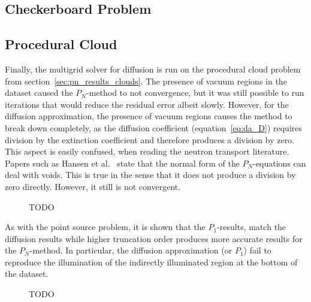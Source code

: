 \subsection{Checkerboard Problem}
\label{sec:da_results_checkerboard}

\subsection{Procedural Cloud}
\label{sec:da_results_clouds}

Finally, the multigrid solver for diffusion is run on the procedural cloud problem from section~\ref{sec:pn_results_clouds}. The presence of vacuum regions in the dataset caused the $P_N$-method to not convergence, but it was still possible to run iterations that would reduce the residual error albeit slowly. However, for the diffusion approximation, the presence of vacuum regions causes the method to break down completely, as the diffusion coefficient (equation~\ref{eq:da_D}) requires division by the extinction coefficient and therefore produces a division by zero. This aspect is easily confused, when reading the neutron transport literature. Papers such as Hansen et al.~\cite{Hansen14} state that the normal form of the $P_N$-equations can deal with voids. This is true in the sense that it does not produce a division by zero directly. However, it still is not convergent.

\begin{figure}[h]
\centering
{}
\caption{TODO}
\label{fig:da_results_nebulae_1}
\end{figure}

As with the point source problem, it is shown that the $P_1$-results, match the diffusion results while higher truncation order produces more accurate results for the $P_N$-method. In particular, the diffusion approximation (or $P_1$) fail to reproduce the illumination of the indirectly illuminated region at the bottom of the dataset.
\begin{figure}[h]
\centering
{}
\caption{TODO}
\label{fig:da_results_nebulae_2}
\end{figure}
